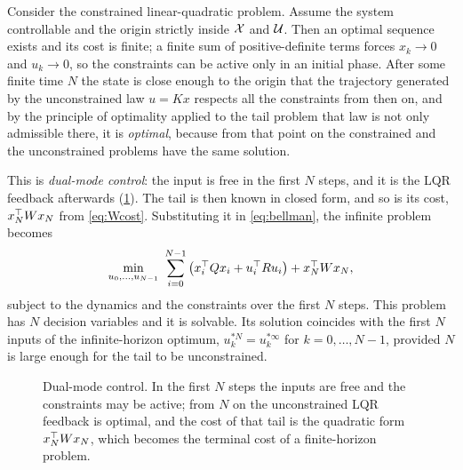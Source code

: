 Consider the constrained linear-quadratic problem. Assume the system controllable and the origin
strictly inside $\mathcal{X}$ and $\mathcal{U}$. Then an optimal sequence exists and its cost is finite; a finite
sum of positive-definite terms forces $x_k \to 0$ and $u_k \to 0$, so the constraints can be
active only in an initial phase. After some finite time $N$ the state is close enough to the
origin that the trajectory generated by the unconstrained law $u = Kx$ respects all the
constraints from then on, and by the principle of optimality applied to the tail problem that
law is not only admissible there, it is \emph{optimal}, because from that point on the
constrained and the unconstrained problems have the same solution.

This is \emph{dual-mode control}: the input is free in the first $N$ steps, and it is the LQR
feedback afterwards (\cref{fig:dualmode}). The tail is then known in closed form, and so is its
cost, $x_N^{\top} W x_N$ from \eqref{eq:Wcost}. Substituting it in \eqref{eq:bellman}, the infinite
problem becomes
\begin{equation}
  \min_{u_0,\dots,u_{N-1}} \ \sum_{i=0}^{N-1}\big(x_i\T Q x_i + u_i\T R u_i\big) + x_N\T W x_N,
  \label{eq:dualmode}
\end{equation}
subject to the dynamics and the constraints over the first $N$ steps. This problem has $N$
decision variables and it is solvable. Its solution coincides with the first $N$ inputs of the
infinite-horizon optimum, $u^{*N}_k = u^{*\infty}_k$ for $k = 0,\dots,N-1$, provided $N$ is
large enough for the tail to be unconstrained.

\begin{figure}[t]
\centering
{}
\caption{Dual-mode control. In the first $N$ steps the inputs are free and the constraints may
be active; from $N$ on the unconstrained LQR feedback is optimal, and the cost of that tail is
the quadratic form $x_N^{\top} W x_N$, which becomes the terminal cost of a finite-horizon problem.}
\label{fig:dualmode}
\end{figure}

